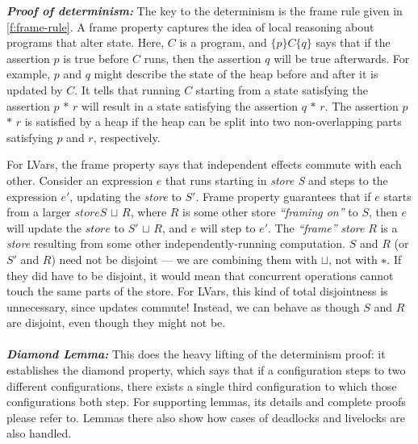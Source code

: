 \documentclass[twocolumn]{article}
\begin{document}
\textbf{\textit{Proof of determinism:}} The key to the determinism is the frame rule given in \ref{f:frame-rule}. A frame property captures the idea of local reasoning about programs that alter state\cite{lindsey}. Here, $C$ is a program, and $\{p\} C \{q\}$ says that if the assertion $p$ is true before $C$ runs, then the assertion $q$ will be true afterwards. For example, $p$ and $q$  might describe the state of the heap before and after it is updated by $C$. It tells that running $C$ starting from a state satisfying the assertion $p$ $\ast$ $r$ will result in a state satisfying the assertion $q$ $\ast$ $r$. The assertion $p$ $\ast$ $r$ is satisfied by a heap if the heap can be split into two non-overlapping parts satisfying $p$ and $r$, respectively.

For LVars, the frame property says that independent effects commute with each other. Consider an expression $e$ that runs starting in \emph{store S} and steps to the expression $e{′}$, updating the \emph{store} to $S{′}$. Frame property guarantees that if $e$ starts from a larger $store S$ $\sqcup$ $R$, where $R$ is some other store \emph{“framing on”} to $S$, then $e$  will update the $store$ to $S′$ $\sqcup$ $R$, and $e$ will step to $e′$. The \emph{“frame”} \emph{store} $R$  is a \emph{store} resulting from some other independently-running computation. $S$ and $R$ (or $S′$ and $R$) need not be disjoint — we are combining them with $\sqcup$, not with $∗$. If they did have to be disjoint, it would mean that concurrent operations cannot touch the same parts of the store. For LVars, this kind of total disjointness is unnecessary, since updates commute! Instead, we can behave as though $S$ and $R$ are disjoint, even though they might not be. \\ \\
\textbf{\textit{Diamond Lemma:}} This does the heavy lifting of the determinism proof: it establishes the diamond property, which says that if a configuration steps to two different configurations, there exists a single third configuration to which those configurations both step. For supporting lemmas, its details and complete proofs please refer to\cite{lkuper}. Lemmas there also show how cases of deadlocks and livelocks are also handled.
\end{document}
